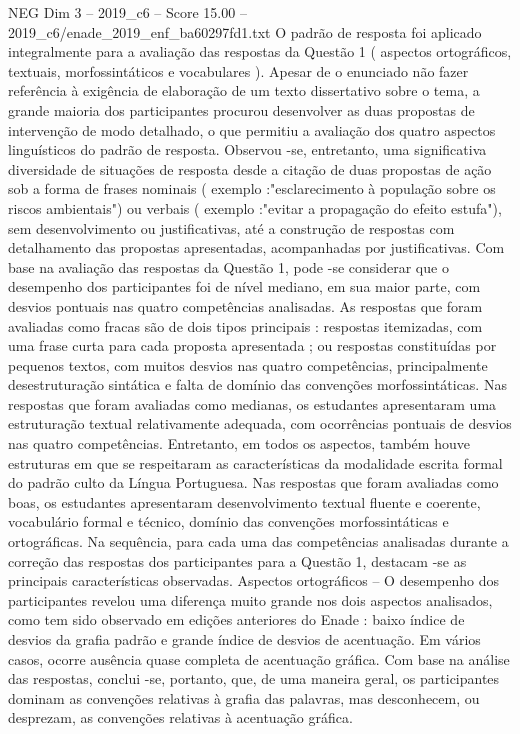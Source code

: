 \begin{textsample}{NEG Dim 3 – 2019\_c6 – Score 15.00 – 2019\_c6/enade\_2019\_enf\_ba60297fd1.txt}
O padrão de resposta foi aplicado integralmente para a avaliação das respostas da Questão 1 ( aspectos ortográficos, textuais, morfossintáticos e vocabulares ).
Apesar de o enunciado não fazer referência à exigência de elaboração de um texto dissertativo sobre o tema, a grande maioria dos participantes procurou desenvolver as duas propostas de intervenção de modo detalhado, o que permitiu a avaliação dos quatro aspectos linguísticos do padrão de resposta.
Observou -se, entretanto, uma significativa diversidade de situações de resposta desde a citação de duas propostas de ação sob a forma de frases nominais ( exemplo :"esclarecimento à população sobre os riscos ambientais") ou verbais ( exemplo :"evitar a propagação do efeito estufa"), sem desenvolvimento ou justificativas, até a construção de respostas com detalhamento das propostas apresentadas, acompanhadas por justificativas.
Com base na avaliação das respostas da Questão 1, pode -se considerar que o desempenho dos participantes foi de nível mediano, em sua maior parte, com desvios pontuais nas quatro competências analisadas.
As respostas que foram avaliadas como fracas são de dois tipos principais : respostas itemizadas, com uma frase curta para cada proposta apresentada ; ou respostas constituídas por pequenos textos, com muitos desvios nas quatro competências, principalmente desestruturação sintática e falta de domínio das convenções morfossintáticas.
Nas respostas que foram avaliadas como medianas, os estudantes apresentaram uma estruturação textual relativamente adequada, com ocorrências pontuais de desvios nas quatro competências.
Entretanto, em todos os aspectos, também houve estruturas em que se respeitaram as características da modalidade escrita formal do padrão culto da Língua Portuguesa.
Nas respostas que foram avaliadas como boas, os estudantes apresentaram desenvolvimento textual fluente e coerente, vocabulário formal e técnico, domínio das convenções morfossintáticas e ortográficas.
Na sequência, para cada uma das competências analisadas durante a correção das respostas dos participantes para a Questão 1, destacam -se as principais características observadas.
Aspectos ortográficos – O desempenho dos participantes revelou uma diferença muito grande nos dois aspectos analisados, como tem sido observado em edições anteriores do Enade : baixo índice de desvios da grafia padrão e grande índice de desvios de acentuação.
Em vários casos, ocorre ausência quase completa de acentuação gráfica.
Com base na análise das respostas, conclui -se, portanto, que, de uma maneira geral, os participantes dominam as convenções relativas à grafia das palavras, mas desconhecem, ou desprezam, as convenções relativas à acentuação gráfica.

\end{textsample}
